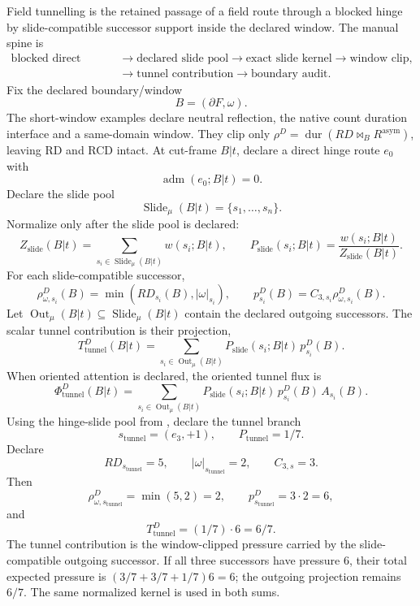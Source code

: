 Field tunnelling is the retained passage of a field route through a blocked hinge by slide-compatible successor support inside the declared window. The manual spine is
\[
\begin{aligned}
\text{blocked direct hinge}
&\to \text{declared slide pool}
\to \text{exact slide kernel}
\to \text{window clip},\\
&\to \text{tunnel contribution}
\to \text{boundary audit}.
\end{aligned}
\]
Fix the declared boundary/window
\[
B=(\partial F,\omega).
\]
The short-window examples declare neutral reflection,
the native count duration interface and a same-domain window. They clip only
\(\rho^D=\operatorname{dur}(RD\bowtie_B R^{\mathrm{asym}})\), leaving RD and RCD intact.
At cut-frame \(B|t\), declare a direct hinge route \(e_0\) with
\[
\operatorname{adm}(e_0;B|t)=0.
\]
Declare the slide pool
\[
\operatorname{Slide}_{\mu}(B|t)=\{s_1,\ldots,s_n\}.
\]
Normalize only after the slide pool is declared:
\[
Z_{\mathrm{slide}}(B|t)
=
\sum_{s_i\in\operatorname{Slide}_{\mu}(B|t)}w(s_i;B|t),
\qquad
P_{\mathrm{slide}}(s_i;B|t)
=
\frac{w(s_i;B|t)}{Z_{\mathrm{slide}}(B|t)}.
\]
For each slide-compatible successor,
\[
\rho^D_{\omega,s_i}(B)=\min(RD_{s_i}(B),|\omega|_{s_i}),
\qquad
p^D_{s_i}(B)=C_{3,s_i}\rho^D_{\omega,s_i}(B).
\]
Let \(\operatorname{Out}_{\mu}(B|t)\subseteq
\operatorname{Slide}_{\mu}(B|t)\) contain the declared outgoing successors.
The scalar tunnel contribution is their projection,
\[
T^D_{\mathrm{tunnel}}(B|t)
=
\sum_{s_i\in\operatorname{Out}_{\mu}(B|t)}
P_{\mathrm{slide}}(s_i;B|t)\,p^D_{s_i}(B).
\]
When oriented attention is declared, the oriented tunnel flux is
\[
\Phi^D_{\mathrm{tunnel}}(B|t)
=
\sum_{s_i\in\operatorname{Out}_{\mu}(B|t)}
P_{\mathrm{slide}}(s_i;B|t)\,p^D_{s_i}(B)\,A_{s_i}(B).
\]
Using the hinge-slide pool from , declare the tunnel branch
\[
s_{\mathrm{tunnel}}=(e_3,+1),
\qquad
P_{\mathrm{tunnel}}=1/7.
\]
Declare
\[
RD_{s_{\mathrm{tunnel}}}=5,
\qquad
|\omega|_{s_{\mathrm{tunnel}}}=2,
\qquad
C_{3,s}=3.
\]
Then
\[
\rho^D_{\omega,s_{\mathrm{tunnel}}}=\min(5,2)=2,
\qquad
p^D_{s_{\mathrm{tunnel}}}=3\cdot2=6,
\]
and
\[
T^D_{\mathrm{tunnel}}=(1/7)\cdot6=6/7.
\]
The tunnel contribution is the window-clipped pressure carried by the slide-compatible outgoing successor.
If all three successors have pressure \(6\), their total expected pressure
is \((3/7+3/7+1/7)6=6\); the outgoing projection remains \(6/7\).
The same normalized kernel is used in both sums.

